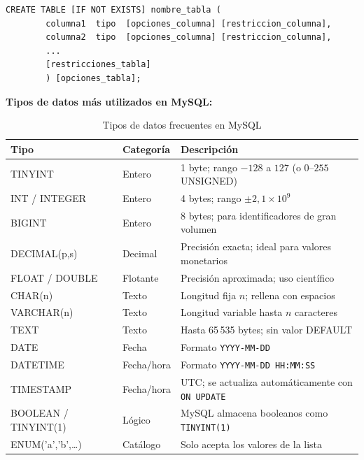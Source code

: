 \documentclass[12pt, a4paper]{article}
\begin{document}
	\begin{lstlisting}[style=sql, caption={Estructura general de CREATE TABLE}]
		CREATE TABLE [IF NOT EXISTS] nombre_tabla (
		columna1  tipo  [opciones_columna] [restriccion_columna],
		columna2  tipo  [opciones_columna] [restriccion_columna],
		...
		[restricciones_tabla]
		) [opciones_tabla];
	\end{lstlisting}
	
	\textbf{Tipos de datos más utilizados en MySQL:}
	
	\begin{table}[H]
		\centering
		\caption{Tipos de datos frecuentes en MySQL}
		\renewcommand{\arraystretch}{1.3}
		\begin{tabularx}{\textwidth}{>{\ttfamily}l l X}
			\toprule
			\textbf{Tipo}         & \textbf{Categoría} & \textbf{Descripción}                             \\
			\midrule
			TINYINT               & Entero    & 1 byte; rango $-128$ a $127$ (o $0$–$255$ UNSIGNED) \\
			INT / INTEGER         & Entero    & 4 bytes; rango $\pm2{,}1 \times 10^9$            \\
			BIGINT                & Entero    & 8 bytes; para identificadores de gran volumen    \\
			DECIMAL(p,s)          & Decimal   & Precisión exacta; ideal para valores monetarios  \\
			FLOAT / DOUBLE        & Flotante  & Precisión aproximada; uso científico             \\
			CHAR(n)               & Texto     & Longitud fija $n$; rellena con espacios          \\
			VARCHAR(n)            & Texto     & Longitud variable hasta $n$ caracteres           \\
			TEXT                  & Texto     & Hasta 65\,535 bytes; sin valor DEFAULT           \\
			DATE                  & Fecha     & Formato \texttt{YYYY-MM-DD}                      \\
			DATETIME              & Fecha/hora& Formato \texttt{YYYY-MM-DD HH:MM:SS}             \\
			TIMESTAMP             & Fecha/hora& UTC; se actualiza automáticamente con \texttt{ON UPDATE} \\
			BOOLEAN / TINYINT(1)  & Lógico    & MySQL almacena booleanos como \texttt{TINYINT(1)} \\
			ENUM('a','b',\ldots)  & Catálogo  & Solo acepta los valores de la lista              \\
			\bottomrule
		\end{tabularx}
	\end{table}
	
\end{document}
